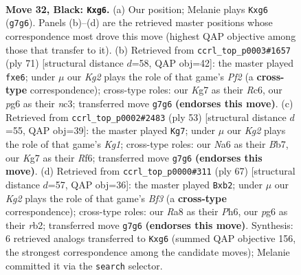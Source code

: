 \documentclass[11pt]{article}
\begin{document}
\clearpage

\begin{figure}[p]\centering
\begin{subfigure}{0.46\textwidth}\centering
\resizebox{\linewidth}{!}{%
\newchessgame
\chessboard[
  setfen={r1b5/p5k1/n1N1p1P1/P1Pp4/1P6/2P5/5K2/R1B5 b - - 0 32},
  showmover=false,
  pgfstyle=straightmove, color=movearrow, markmove={g7-g6}
]}
\caption{}
\end{subfigure}\hfill
\begin{subfigure}{0.46\textwidth}\centering
\resizebox{\linewidth}{!}{%
\newchessgame
\chessboard[
  setfen={8/5pk1/p1r1Pn2/6p1/K5Pp/2N4P/1PP1R3/8 b - - 0 36},
  showmover=false,
  pgfstyle=straightmove, color=movearrow, markmove={f7-e6}
]}
\caption{}
\end{subfigure}
\\[4pt]
\begin{subfigure}{0.46\textwidth}\centering
\resizebox{\linewidth}{!}{%
\newchessgame
\chessboard[
  setfen={6k1/1b6/p2p1rPp/4n3/3RP3/2N5/1PP1B3/2K5 b - - 0 27},
  showmover=false,
  pgfstyle=straightmove, color=movearrow, markmove={g8-g7}
]}
\caption{}
\end{subfigure}\hfill
\begin{subfigure}{0.46\textwidth}\centering
\resizebox{\linewidth}{!}{%
\newchessgame
\chessboard[
  setfen={6k1/8/5b1p/5pp1/4n3/4PNP1/1R3P1P/5BK1 b - - 0 34},
  showmover=false,
  pgfstyle=straightmove, color=movearrow, markmove={f6-b2}
]}
\caption{}
\end{subfigure}
\caption{\textbf{Move 32, Black: \texttt{Kxg6}.} (a) Our position; Melanie plays \texttt{Kxg6} (\texttt{g7g6}). Panels (b)--(d) are the retrieved master positions whose correspondence most drove this move (highest QAP objective among those that transfer to it). (b) Retrieved from \texttt{ccrl\_top\_p0003\#1657} (ply 71) [structural distance $d$=58, QAP obj=42]: the master played \texttt{fxe6}; under $\mu$ our \emph{Kg2} plays the role of that game's \emph{Pf2} (a \textbf{cross-type} correspondence); cross-type roles: our \emph{K}g7 as their \emph{R}c6, our \emph{p}g6 as their \emph{n}c3; transferred move \texttt{g7g6} \textbf{(endorses this move)}. (c) Retrieved from \texttt{ccrl\_top\_p0002\#2483} (ply 53) [structural distance $d$=55, QAP obj=39]: the master played \texttt{Kg7}; under $\mu$ our \emph{Kg2} plays the role of that game's \emph{Kg1}; cross-type roles: our \emph{N}a6 as their \emph{B}b7, our \emph{K}g7 as their \emph{R}f6; transferred move \texttt{g7g6} \textbf{(endorses this move)}. (d) Retrieved from \texttt{ccrl\_top\_p0000\#311} (ply 67) [structural distance $d$=57, QAP obj=36]: the master played \texttt{Bxb2}; under $\mu$ our \emph{Kg2} plays the role of that game's \emph{Bf3} (a \textbf{cross-type} correspondence); cross-type roles: our \emph{R}a8 as their \emph{P}h6, our \emph{p}g6 as their \emph{r}b2; transferred move \texttt{g7g6} \textbf{(endorses this move)}. Synthesis: 6 retrieved analogs transferred to \texttt{Kxg6} (summed QAP objective 156, the strongest correspondence among the candidate moves); Melanie committed it via the \texttt{search} selector.}
\label{fig:thought-m63}
\end{figure}
\end{document}

